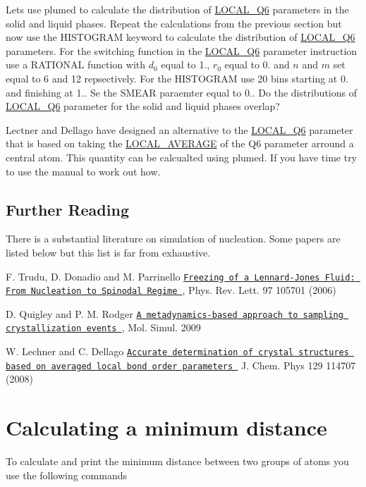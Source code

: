 Lets use plumed to calculate the distribution of \hyperlink{LOCAL_Q6}{L\+O\+C\+A\+L\+\_\+\+Q6} parameters in the solid and liquid phases. Repeat the calculations from the previous section but now use the H\+I\+S\+T\+O\+G\+R\+A\+M keyword to calculate the distribution of \hyperlink{LOCAL_Q6}{L\+O\+C\+A\+L\+\_\+\+Q6} parameters. For the switching function in the \hyperlink{LOCAL_Q6}{L\+O\+C\+A\+L\+\_\+\+Q6} parameter instruction use a R\+A\+T\+I\+O\+N\+A\+L function with $d_0$ equal to 1., $r_0$ equal to 0. and $n$ and $m$ set equal to 6 and 12 repsectively. For the H\+I\+S\+T\+O\+G\+R\+A\+M use 20 bins starting at 0. and finishing at 1.. Se the S\+M\+E\+A\+R paraemter equal to 0.. Do the distributions of \hyperlink{LOCAL_Q6}{L\+O\+C\+A\+L\+\_\+\+Q6} parameter for the solid and liquid phases overlap?

Lectner and Dellago have designed an alternative to the \hyperlink{LOCAL_Q6}{L\+O\+C\+A\+L\+\_\+\+Q6} parameter that is based on taking the \hyperlink{LOCAL_AVERAGE}{L\+O\+C\+A\+L\+\_\+\+A\+V\+E\+R\+A\+G\+E} of the Q6 parameter arround a central atom. This quantity can be calcualted using plumed. If you have time try to use the manual to work out how.\hypertarget{belfast-10_further}{}\subsection{Further Reading}\label{belfast-10_further}
There is a substantial literature on simulation of nucleation. Some papers are listed below but this list is far from exhaustive.


\begin{DoxyItemize}
\item F. Trudu, D. Donadio and M. Parrinello \href{http://journals.aps.org/prl/abstract/10.1103/PhysRevLett.97.105701}{\tt Freezing of a Lennard-\/\+Jones Fluid\+: From Nucleation to Spinodal Regime }, Phys. Rev. Lett. 97 105701 (2006)
\item D. Quigley and P. M. Rodger \href{http://dx.doi.org/10.1080/08927020802647280}{\tt A metadynamics-\/based approach to sampling crystallization events }, Mol. Simul. 2009
\item W. Lechner and C. Dellago \href{http://scitation.aip.org/content/aip/journal/jcp/129/11/10.1063/1.2977970}{\tt Accurate determination of crystal structures based on averaged local bond order parameters } J. Chem. Phys 129 114707 (2008) 
\end{DoxyItemize}\hypertarget{mindist}{}\section{Calculating a minimum distance}\label{mindist}
To calculate and print the minimum distance between two groups of atoms you use the following commands

